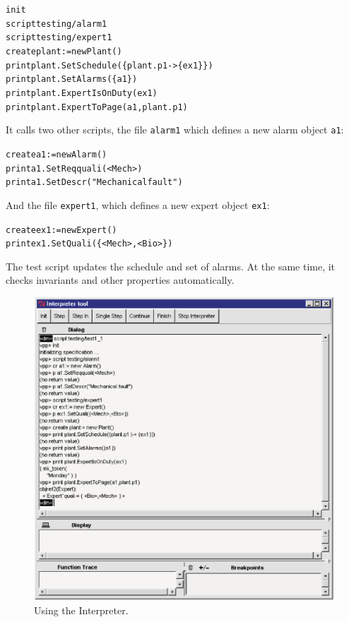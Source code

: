\documentclass[\pformat,12pt,twoside]{article}
\begin{document}
\small
\begin{alltt}
  init
  script testing/alarm1
  script testing/expert1
  create plant := new Plant()
  print plant.SetSchedule(\{plant.p1 {\textbar}-\texttt{>} \{ex1\}\})
  print plant.SetAlarms(\{a1\})
  print plant.ExpertIsOnDuty(ex1)
  print plant.ExpertToPage(a1,plant.p1) 
\end{alltt}
\normalsize

It calls two other scripts, the file \texttt{alarm1} which defines a new 
alarm object \texttt{a1}:

\small
\begin{alltt}
  create a1 := new Alarm()
  print a1.SetReqquali(\texttt{<}Mech\texttt{>})
  print a1.SetDescr("Mechanical fault")
\end{alltt}
\normalsize

And the file \texttt{expert1}, which defines a new expert object \texttt{ex1}:

\small
\begin{alltt}
  create ex1 := new Expert()
  print ex1.SetQuali(\{\texttt{<}Mech\texttt{>},\texttt{<}Bio\texttt{>}\})
\end{alltt}
\normalsize

The test script updates the schedule and set of alarms. At the 
same time, it checks invariants and other properties automatically.

\begin{figure}[H]
\begin{center}
\includegraphics[width=5.546in]{firstscreendump}
\caption{Using the Interpreter.\label{fig:firstscreendump}}
\end{center}
\end{figure}
\end{document}
